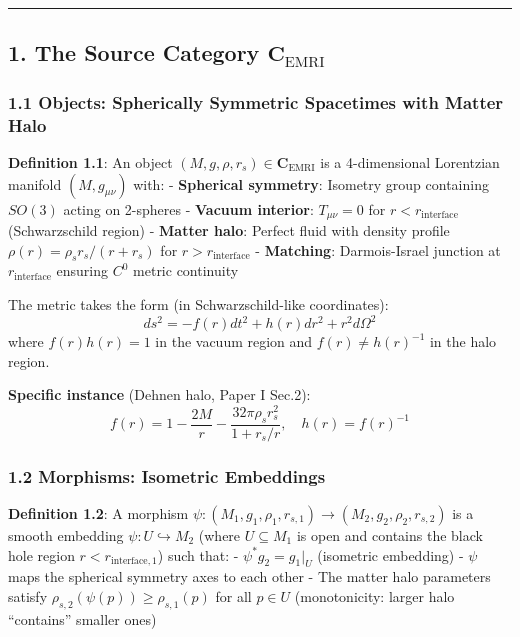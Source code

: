 \documentclass[
]{article}
\begin{document}
\begin{center}\rule{0.5\linewidth}{0.5pt}\end{center}

\subsection{\texorpdfstring{1. The Source Category
\(\mathbf{C}_{\text{EMRI}}\)}{1. The Source Category \textbackslash mathbf\{C\}\_\{\textbackslash text\{EMRI\}\}}}\label{the-source-category-mathbfc_textemri}

\subsubsection{1.1 Objects: Spherically Symmetric Spacetimes with Matter
Halo}\label{objects-spherically-symmetric-spacetimes-with-matter-halo}

\textbf{Definition 1.1}: An object
\((M, g, \rho, r_s) \in \mathbf{C}_{\text{EMRI}}\) is a 4-dimensional
Lorentzian manifold \((M, g_{\mu\nu})\) with: - \textbf{Spherical
symmetry}: Isometry group containing \(SO(3)\) acting on 2-spheres -
\textbf{Vacuum interior}: \(T_{\mu\nu} = 0\) for
\(r < r_{\text{interface}}\) (Schwarzschild region) - \textbf{Matter
halo}: Perfect fluid with density profile
\(\rho(r) = \rho_s r_s / (r + r_s)\) for \(r > r_{\text{interface}}\) -
\textbf{Matching}: Darmois-Israel junction at \(r_{\text{interface}}\)
ensuring \(C^0\) metric continuity

The metric takes the form (in Schwarzschild-like coordinates):
\[ds^2 = -f(r)dt^2 + h(r)dr^2 + r^2 d\Omega^2\] where \(f(r)h(r) = 1\)
in the vacuum region and \(f(r) \neq h(r)^{-1}\) in the halo region.

\textbf{Specific instance} (Dehnen halo, Paper I Sec.2):
\[f(r) = 1 - \frac{2M}{r} - \frac{32\pi\rho_s r_s^2}{1 + r_s/r}, \quad h(r) = f(r)^{-1}\]

\subsubsection{1.2 Morphisms: Isometric
Embeddings}\label{morphisms-isometric-embeddings}

\textbf{Definition 1.2}: A morphism
\(\psi: (M_1, g_1, \rho_1, r_{s,1}) \to (M_2, g_2, \rho_2, r_{s,2})\) is
a smooth embedding \(\psi: U \hookrightarrow M_2\) (where
\(U \subseteq M_1\) is open and contains the black hole region
\(r < r_{\text{interface},1}\)) such that: - \(\psi^* g_2 = g_1|_U\)
(isometric embedding) - \(\psi\) maps the spherical symmetry axes to
each other - The matter halo parameters satisfy
\(\rho_{s,2}(\psi(p)) \geq \rho_{s,1}(p)\) for all \(p \in U\)
(monotonicity: larger halo ``contains'' smaller ones)
\end{document}
